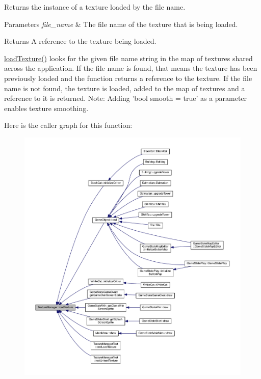 Returns the instance of a texture loaded by the file name. 


\begin{DoxyParams}{Parameters}
{\em file\+\_\+name} & The file name of the texture that is being loaded. \\
\hline
\end{DoxyParams}
\begin{DoxyReturn}{Returns}
A reference to the texture being loaded.
\end{DoxyReturn}
\hyperlink{class_texture_manager_aa631660b783d448a29b1096c64fe65e4}{load\+Texture()} looks for the given file name string in the map of textures shared across the application. If the file name is found, that means the texture has been previously loaded and the function returns a reference to the texture. If the file name is not found, the texture is loaded, added to the map of textures and a reference to it is returned. Note\+: Adding 'bool smooth = true' as a parameter enables texture smoothing. 

Here is the caller graph for this function\+:
\nopagebreak
\begin{figure}[H]
\begin{center}
\leavevmode
\includegraphics[width=350pt]{class_texture_manager_aa631660b783d448a29b1096c64fe65e4_icgraph}
\end{center}
\end{figure}



